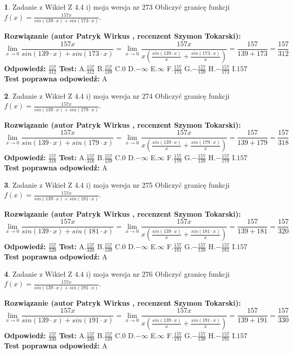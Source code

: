 \documentclass[12pt, a4paper]{article}
\theoremstyle{definition} %
\newtheorem{zad}{}
\newcommand{\zadStart}[1]{\begin{zad}#1\newline}
\newcommand{\zadStop}{\end{zad}}
\newcommand{\rozwStart}[2]{\noindent \textbf{Rozwiązanie (autor #1 , recenzent #2): }\newline}
\newcommand{\rozwStop}{\newline}
\newcommand{\odpStart}{\noindent \textbf{Odpowiedź:}\newline}
\newcommand{\odpStop}{\newline}
\newcommand{\testStart}{\noindent \textbf{Test:}\newline}
\newcommand{\testStop}{\newline}
\newcommand{\kluczStart}{\noindent \textbf{Test poprawna odpowiedź:}\newline}
\newcommand{\kluczStop}{\newline}
\begin{document}
\zadStart{Zadanie z Wikieł Z 4.4 i) moja wersja nr 273}
Obliczyć granicę funkcji $f(x)=\frac{157x}{sin(139\cdot x) +sin(173\cdot x)}$.
\zadStop
\rozwStart{Patryk Wirkus}{Szymon Tokarski}
$$\lim\limits_{x\to 0}\frac{157x}{sin(139\cdot x) +sin(173\cdot x)}=\lim\limits_{x\to 0}\frac{157x}{x(\frac{sin(139\cdot x)}{x}+\frac{sin(173\cdot x)}{x})}=\frac{157}{139+173} = \frac{157}{312}$$
\rozwStop
\odpStart
$\frac{157}{312}$
\odpStop
\testStart
A.$\frac{157}{312}$
B.$\frac{157}{139}$
C.$0$
D.$-\infty$
E.$\infty$
F.$\frac{157}{173}$
G.$-\frac{157}{139}$
H.$-\frac{157}{173}$
I.$157$
\testStop
\kluczStart
A
\kluczStop



\zadStart{Zadanie z Wikieł Z 4.4 i) moja wersja nr 274}
Obliczyć granicę funkcji $f(x)=\frac{157x}{sin(139\cdot x) +sin(179\cdot x)}$.
\zadStop
\rozwStart{Patryk Wirkus}{Szymon Tokarski}
$$\lim\limits_{x\to 0}\frac{157x}{sin(139\cdot x) +sin(179\cdot x)}=\lim\limits_{x\to 0}\frac{157x}{x(\frac{sin(139\cdot x)}{x}+\frac{sin(179\cdot x)}{x})}=\frac{157}{139+179} = \frac{157}{318}$$
\rozwStop
\odpStart
$\frac{157}{318}$
\odpStop
\testStart
A.$\frac{157}{318}$
B.$\frac{157}{139}$
C.$0$
D.$-\infty$
E.$\infty$
F.$\frac{157}{179}$
G.$-\frac{157}{139}$
H.$-\frac{157}{179}$
I.$157$
\testStop
\kluczStart
A
\kluczStop



\zadStart{Zadanie z Wikieł Z 4.4 i) moja wersja nr 275}
Obliczyć granicę funkcji $f(x)=\frac{157x}{sin(139\cdot x) +sin(181\cdot x)}$.
\zadStop
\rozwStart{Patryk Wirkus}{Szymon Tokarski}
$$\lim\limits_{x\to 0}\frac{157x}{sin(139\cdot x) +sin(181\cdot x)}=\lim\limits_{x\to 0}\frac{157x}{x(\frac{sin(139\cdot x)}{x}+\frac{sin(181\cdot x)}{x})}=\frac{157}{139+181} = \frac{157}{320}$$
\rozwStop
\odpStart
$\frac{157}{320}$
\odpStop
\testStart
A.$\frac{157}{320}$
B.$\frac{157}{139}$
C.$0$
D.$-\infty$
E.$\infty$
F.$\frac{157}{181}$
G.$-\frac{157}{139}$
H.$-\frac{157}{181}$
I.$157$
\testStop
\kluczStart
A
\kluczStop



\zadStart{Zadanie z Wikieł Z 4.4 i) moja wersja nr 276}
Obliczyć granicę funkcji $f(x)=\frac{157x}{sin(139\cdot x) +sin(191\cdot x)}$.
\zadStop
\rozwStart{Patryk Wirkus}{Szymon Tokarski}
$$\lim\limits_{x\to 0}\frac{157x}{sin(139\cdot x) +sin(191\cdot x)}=\lim\limits_{x\to 0}\frac{157x}{x(\frac{sin(139\cdot x)}{x}+\frac{sin(191\cdot x)}{x})}=\frac{157}{139+191} = \frac{157}{330}$$
\rozwStop
\odpStart
$\frac{157}{330}$
\odpStop
\testStart
A.$\frac{157}{330}$
B.$\frac{157}{139}$
C.$0$
D.$-\infty$
E.$\infty$
F.$\frac{157}{191}$
G.$-\frac{157}{139}$
H.$-\frac{157}{191}$
I.$157$
\testStop
\kluczStart
A
\kluczStop
\end{document}
